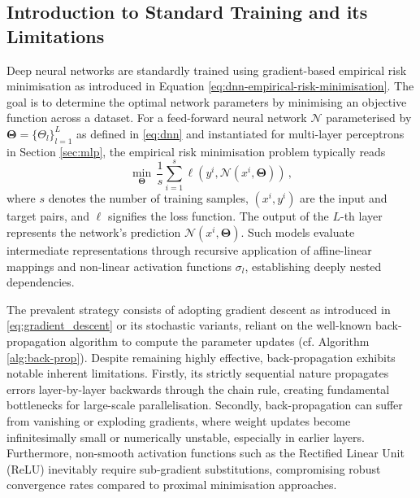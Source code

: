\subsection{Introduction to Standard Training and its Limitations}
Deep neural networks are standardly trained using gradient-based empirical risk minimisation as introduced in Equation \eqref{eq:dnn-empirical-risk-minimisation}. The goal is to determine the optimal network parameters by minimising an objective function across a dataset. For a feed-forward neural network $\mathcal{N}$ parameterised by $\mathbf{\Theta} = \{\Theta_l\}_{l=1}^L$ as defined in \eqref{eq:dnn} and instantiated for multi-layer perceptrons in Section \ref{sec:mlp}, the empirical risk minimisation problem typically reads
\begin{equation*}
    \min_{\mathbf{\Theta}} \, \frac{1}{s}\sum_{i=1}^s \ell(y^i, \mathcal{N}(x^i, \mathbf{\Theta})) \, ,
\end{equation*}
where $s$ denotes the number of training samples, $(x^i, y^i)$ are the input and target pairs, and $\ell$ signifies the loss function. The output of the $L$-th layer represents the network's prediction $\mathcal{N}(x^i, \mathbf{\Theta})$. Such models evaluate intermediate representations through recursive application of affine-linear mappings and non-linear activation functions $\sigma_l$, establishing deeply nested dependencies. 

The prevalent strategy consists of adopting gradient descent as introduced in \eqref{eq:gradient_descent} or its stochastic variants, reliant on the well-known back-propagation algorithm to compute the parameter updates (cf. Algorithm \ref{alg:back-prop}). Despite remaining highly effective, back-propagation exhibits notable inherent limitations. Firstly, its strictly sequential nature propagates errors layer-by-layer backwards through the chain rule, creating fundamental bottlenecks for large-scale parallelisation. Secondly, back-propagation can suffer from vanishing or exploding gradients, where weight updates become infinitesimally small or numerically unstable, especially in earlier layers. Furthermore, non-smooth activation functions such as the Rectified Linear Unit (ReLU) inevitably require sub-gradient substitutions, compromising robust convergence rates compared to proximal minimisation approaches. 

